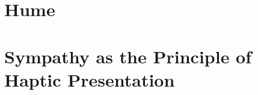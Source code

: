 
\section{Hume} %
\label{sec:hume}


\section{Sympathy as the Principle of Haptic Presentation} %
\label{sec:sympathy_as_the_principle_of_haptic_presentation}



